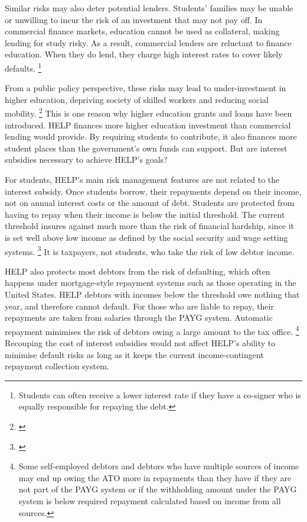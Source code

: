 \documentclass[embargoed]{grattan}
\begin{document}
Similar risks may also deter potential lenders.
Students' families may be unable or unwilling to incur the risk of an investment that may not pay off.
In commercial finance markets, education cannot be used as collateral, making lending for study risky.
As a result, commercial lenders are reluctant to finance education.
When they do lend, they charge high interest rates to cover likely defaults.%
\footnote{Students can often receive a lower interest rate if they have a co-signer who is equally responsible for repaying the debt.}

From a public policy perspective, these risks may lead to under-investment in higher education, depriving society of skilled workers and reducing social mobility.%
\footnote{\textcite[][section 2.5]{Chapman2006Governmentmanagingrisk}} This is one reason why higher education grants and loans have been introduced.
\gls{HELP} finances more higher education investment than commercial lending would provide.
By requiring students to contribute, it also finances more student places than the government's own funds can support.
But are interest subsidies necessary to achieve \gls{HELP}'s goals?

For students, \gls{HELP}'s main risk management features are not related to the interest subsidy.
Once students borrow, their repayments depend on their income, not on annual interest costs or the amount of debt.
Students are protected from having to repay when their income is below the initial threshold.
The current threshold insures against much more than the risk of financial hardship, since it is set well above low income as defined by the social security and wage setting systems.%
\footnote{\textcite[][chapter 4]{Norton2016HELPfuturefairer}} It is taxpayers, not students, who take the risk of low debtor income.

\gls{HELP} also protects most debtors from the risk of defaulting, which often happens under mortgage-style repayment systems such as those operating in the United States.
\gls{HELP} debtors with incomes below the threshold owe nothing that year, and therefore cannot default.
For those who are liable to repay, their repayments are taken from salaries through the \gls{PAYG} system.
Automatic repayment minimises the risk of debtors owing a large amount to the tax office.%
\footnote{Some self-employed debtors and debtors who have multiple sources of income may end up owing the \gls{ATO} more in repayments than they have if they are not part of the \gls{PAYG} system or if the withholding amount under the \gls{PAYG} system is below required repayment calculated based on income from all sources.} Recouping the cost of interest subsidies would not affect \gls{HELP}'s ability to minimise default risks as long as it keeps the current income-contingent repayment collection system.
\end{document}
